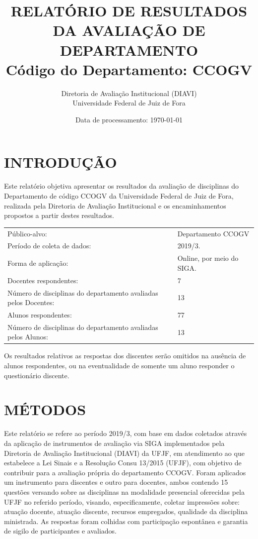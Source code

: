 \documentclass[a4paper,10pt]{article}
\date{Data de processamento: \today}
\begin{document}
\author{Diretoria de Avaliação Institucional (DIAVI) \\ Universidade Federal de Juiz de Fora}

\title{RELATÓRIO DE RESULTADOS DA AVALIAÇÃO DE DEPARTAMENTO\\ Código do Departamento: CCOGV}
\maketitle
\section{INTRODUÇÃO}
Este relatório objetiva apresentar os resultados da avaliação de disciplinas do Departamento     de código CCOGV da Universidade Federal de Juiz de Fora, realizada pela     Diretoria de Avaliação Institucional e os encaminhamentos propostos a     partir destes resultados.

\begin{center}
\begin{tabularx}{\linewidth}{X|l}

Público-alvo:& Departamento  CCOGV\\

Período de coleta de dados:& 2019/3.\\

Forma de aplicação:& Online, por meio do SIGA.\\

Docentes respondentes:& 7\\

Número de disciplinas do departamento avaliadas pelos Docentes:& 13\\

Alunos   respondentes:& 77\\

Número de disciplinas do departamento  avaliadas pelos   Alunos:& 13\\
\end{tabularx}
\end{center}

Os resultados relativos as respostas dos discentes serão omitidos na ausência de alunos respondentes, ou na eventualidade de somente um aluno responder o questionário discente.
\section{MÉTODOS}
Este relatório se refere ao período 2019/3, com base em dados     coletados através da aplicação de instrumentos de avaliação via SIGA     implementados pela Diretoria de Avaliação Institucional (DIAVI) da UFJF, em atendimento     ao que estabelece a Lei Sinais e a Resolução Consu 13/2015 (UFJF),     com objetivo de contribuir para a avaliação própria do departamento CCOGV.    Foram aplicados um instrumento para discentes e outro para docentes, ambos contendo     15 questões versando sobre as disciplinas na modalidade presencial oferecidas pela UFJF no     referido período, visando, especificamente, coletar impressões sobre: atuação docente, atuação discente,     recursos empregados, qualidade da disciplina ministrada.     As respostas foram colhidas      com participação espontânea e garantia de    sigilo de participantes e avaliados.
\end{document}
